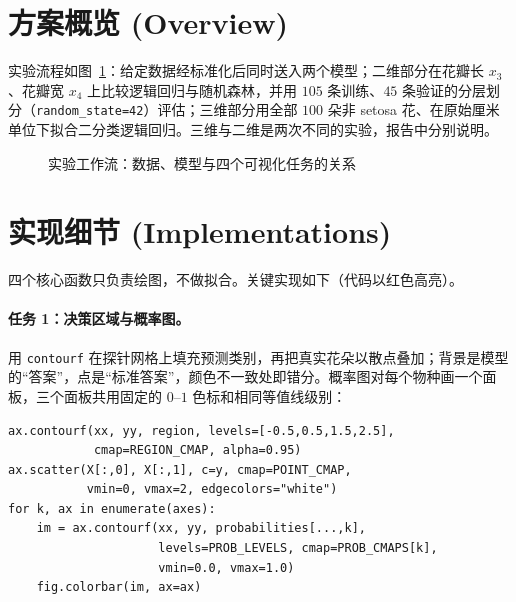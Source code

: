 \documentclass[a4paper,11pt]{article}
\begin{document}
\section{方案概览 (Overview)}
实验流程如图~\ref{fig:flow}：给定数据经标准化后同时送入两个模型；二维部分在花瓣长 $x_3$、花瓣宽 $x_4$ 上比较逻辑回归与随机森林，并用 $105$ 条训练、$45$ 条验证的分层划分（\texttt{random\_state=42}）评估；三维部分用全部 $100$ 朵非 setosa 花、在原始厘米单位下拟合二分类逻辑回归。三维与二维是两次不同的实验，报告中分别说明。

\begin{figure}[H]
\centering
{}
\caption{实验工作流：数据、模型与四个可视化任务的关系}
\label{fig:flow}
\end{figure}

\section{实现细节 (Implementations)}
四个核心函数只负责绘图，不做拟合。关键实现如下（代码以红色高亮）。

\paragraph{任务 1：决策区域与概率图。}
用 \texttt{contourf} 在探针网格上填充预测类别，再把真实花朵以散点叠加；背景是模型的``答案''，点是``标准答案''，颜色不一致处即错分。概率图对每个物种画一个面板，三个面板共用固定的 $0$--$1$ 色标和相同等值线级别：
\begin{lstlisting}
ax.contourf(xx, yy, region, levels=[-0.5,0.5,1.5,2.5],
            cmap=REGION_CMAP, alpha=0.95)
ax.scatter(X[:,0], X[:,1], c=y, cmap=POINT_CMAP,
           vmin=0, vmax=2, edgecolors="white")
for k, ax in enumerate(axes):
    im = ax.contourf(xx, yy, probabilities[...,k],
                     levels=PROB_LEVELS, cmap=PROB_CMAPS[k],
                     vmin=0.0, vmax=1.0)
    fig.colorbar(im, ax=ax)
\end{lstlisting}
\end{document}
